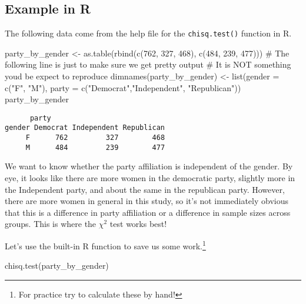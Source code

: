 \documentclass[
  letterpaper,
  DIV=11,
  numbers=noendperiod]{scrreprt}
\newenvironment{Shaded}{\begin{snugshade}}{\end{snugshade}}
\newcommand{\AttributeTok}[1]{\textcolor[rgb]{0.40,0.45,0.13}{#1}}
\newcommand{\CommentTok}[1]{\textcolor[rgb]{0.37,0.37,0.37}{#1}}
\newcommand{\DecValTok}[1]{\textcolor[rgb]{0.68,0.00,0.00}{#1}}
\newcommand{\FunctionTok}[1]{\textcolor[rgb]{0.28,0.35,0.67}{#1}}
\newcommand{\NormalTok}[1]{\textcolor[rgb]{0.00,0.23,0.31}{#1}}
\newcommand{\OtherTok}[1]{\textcolor[rgb]{0.00,0.23,0.31}{#1}}
\newcommand{\StringTok}[1]{\textcolor[rgb]{0.13,0.47,0.30}{#1}}
\begin{document}
\hypertarget{example-in-r}{%
\subsection{Example in R}\label{example-in-r}}

The following data come from the help file for the \texttt{chisq.test()}
function in R.

\begin{Shaded}
\begin{Highlighting}[]
\NormalTok{party\_by\_gender }\OtherTok{\textless{}{-}} \FunctionTok{as.table}\NormalTok{(}\FunctionTok{rbind}\NormalTok{(}\FunctionTok{c}\NormalTok{(}\DecValTok{762}\NormalTok{, }\DecValTok{327}\NormalTok{, }\DecValTok{468}\NormalTok{), }\FunctionTok{c}\NormalTok{(}\DecValTok{484}\NormalTok{, }\DecValTok{239}\NormalTok{, }\DecValTok{477}\NormalTok{)))}
\CommentTok{\# The following line is just to make sure we get pretty output}
\CommentTok{\# It is NOT something you\textquotesingle{}d be expect to reproduce}
\FunctionTok{dimnames}\NormalTok{(party\_by\_gender) }\OtherTok{\textless{}{-}} \FunctionTok{list}\NormalTok{(}\AttributeTok{gender =} \FunctionTok{c}\NormalTok{(}\StringTok{"F"}\NormalTok{, }\StringTok{"M"}\NormalTok{),}
    \AttributeTok{party =} \FunctionTok{c}\NormalTok{(}\StringTok{"Democrat"}\NormalTok{,}\StringTok{"Independent"}\NormalTok{, }\StringTok{"Republican"}\NormalTok{))}
\NormalTok{party\_by\_gender}
\end{Highlighting}
\end{Shaded}

\begin{verbatim}
      party
gender Democrat Independent Republican
     F      762         327        468
     M      484         239        477
\end{verbatim}

We want to know whether the party affiliation is independent of the
gender. By eye, it looks like there are more women in the democratic
party, slightly more in the Independent party, and about the same in the
republican party. However, there are more women in general in this
study, so it's not immediately obvious that this is a difference in
party affiliation or a difference in sample sizes across groups. This is
where the \(\chi^2\) test works best!

Let's use the built-in R function to save us some work.\footnote{For
  practice try to calculate these by hand!}

\begin{Shaded}
\begin{Highlighting}[]
\FunctionTok{chisq.test}\NormalTok{(party\_by\_gender)}
\end{Highlighting}
\end{Shaded}
\end{document}
